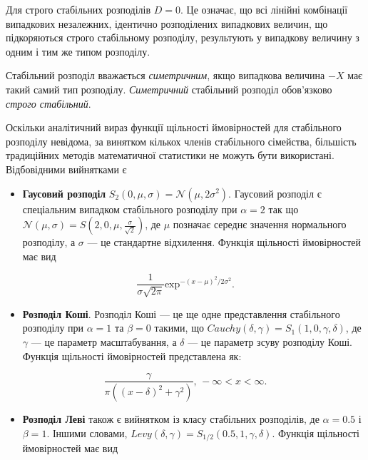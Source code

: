 \documentclass[
  letterpaper,
]{report}
\providecommand{\tightlist}{%
  \setlength{\itemsep}{0pt}\setlength{\parskip}{0pt}}\usepackage{longtable,booktabs,array}
\begin{document}
Для строго стабільних розподілів \(D = 0\). Це означає, що всі лінійні
комбінації випадкових незалежних, ідентично розподілених випадкових
величин, що підкоряються строго стабільному розподілу, результують у
випадкову величину з одним і тим же типом розподілу.

Стабільний розподіл вважається \emph{симетричним}, якщо випадкова
величина \(-X\) має такий самий тип розподілу. \emph{Симетричний}
стабільний розподіл обов'язково \emph{строго стабільний}.

Оскільки аналітичний вираз функції щільності ймовірностей для
стабільного розподілу невідома, за винятком кількох членів стабільного
сімейства, більшість традиційних методів математичної статистики не
можуть бути використані. Відбовідними вийнятками є

\begin{itemize}
\tightlist
\item
  \textbf{Гаусовий розподіл}
  \(S_2(0,\mu, \sigma) = \mathcal{N}(\mu, 2\sigma^2)\). Гаусовий
  розподіл є спеціальним випадком стабільного розподілу при
  \(\alpha = 2\) так що
  \(\mathcal{N}(\mu, \sigma) = S(2,0,\mu, \frac{\sigma}{\sqrt{2}})\), де
  \(\mu\) позначає середнє значення нормального розподілу, а \(\sigma\)
  --- це стандартне відхилення. Функція щільності ймовірностей має вид
\end{itemize}

\[ 
\frac{1}{\sigma\sqrt{2\pi}}\text{exp}^{-(x-\mu)^{2}/2\sigma^{2}}. 
\]

\begin{itemize}
\tightlist
\item
  \textbf{Розподіл Коші}. Розподіл Коші --- це ще одне представлення
  стабільного розподілу при \(\alpha = 1\) та \(\beta = 0\) такими, що
  \(Cauchy(\delta, \gamma) = S_1(1,0,\gamma,\delta)\), де \(\gamma\) ---
  це параметр масштабування, а \(\delta\) --- це параметр зсуву
  розподілу Коші. Функція щільності ймовірностей представлена як:
\end{itemize}

\[ 
\frac{\gamma}{\pi((x-\delta)^2 + \gamma^2)}, \, -\infty < x < \infty. 
\]

\begin{itemize}
\tightlist
\item
  \textbf{Розподіл Леві} також є вийнятком із класу стабільних
  розподілів, де \(\alpha = 0.5\) і \(\beta = 1\). Іншими словами,
  \(Levy(\delta, \gamma) = S_{1/2}(0.5, 1, \gamma, \delta)\). Функція
  щільності ймовірностей має вид
\end{itemize}
\end{document}
